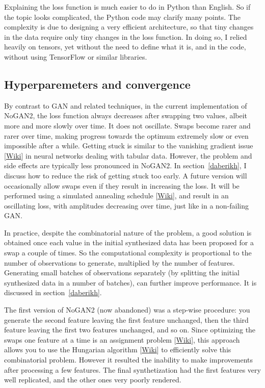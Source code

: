 \documentclass[oneside,10pt]{book}
\begin{document}
Explaining the loss function is much easier to do in Python than English. So if the topic looks complicated, the Python code may clarify many points.
 The complexity is due to designing a very efficient architecture, so that tiny changes in the data require only tiny changes in the loss function.
 In doing so, I relied heavily on \textcolor{index}{tensors}, yet without the need to define what it is, and in the code,
 without using \textcolor{index}{TensorFlow} or similar libraries.



\subsection{Hyperparemeters  and convergence}\label{oipvbc}

By contrast to GAN and related techniques, in the current implementation of NoGAN2, the loss function always decreases after swapping two values, albeit more and more slowly over time. It does not oscillate. Swaps become rarer and rarer over time, making progress towards the optimum extremely slow or even impossible after a while. Getting stuck is similar to the \textcolor{index}{vanishing gradient} issue
 [\href{https://en.wikipedia.org/wiki/Vanishing_gradient_problem}{Wiki}] in neural networks dealing with tabular data. However,
 the problem and side effects are typically less pronounced in NoGAN2. In section~\ref{daberikh}, I discuss how to reduce the risk of getting stuck too early. A future version will occasionally allow swaps even if they result in increasing the loss. It will be performed
 using a \textcolor{index}{simulated annealing} schedule [\href{https://en.wikipedia.org/wiki/Simulated_annealing}{Wiki}], and result in an oscillating loss, with amplitudes decreasing over time, just like in a non-failing GAN.

In practice, despite the combinatorial nature of the problem, a good solution is obtained once each value in the initial synthesized data has been proposed for a swap a couple of times. So the computational complexity is proportional to the number of observations to generate, multiplied by the
 number of features.  Generating small \textcolor{index}{batches} of observations separately (by splitting the initial synthesized data in a number of batches), can further improve performance. It is discussed
 in section~\ref{daberikh}.

The first version of NoGAN2 (now abandoned) was a step-wise procedure: you generate the second feature leaving the first feature unchanged, then the third feature leaving the first two features unchanged, and so on. Since optimizing the swaps one feature at a time is an
 \textcolor{index}{assignment problem} [\href{https://en.wikipedia.org/wiki/Assignment_problem}{Wiki}], this approach allows you to use the \textcolor{index}{Hungarian algorithm} [\href{https://en.wikipedia.org/wiki/Hungarian_algorithm}{Wiki}]
to efficiently solve this combinatorial problem. However it resulted the inability to make improvements  after processing a few features. The final  synthetization had the first features very well replicated, and the other ones very poorly rendered.
\end{document}
